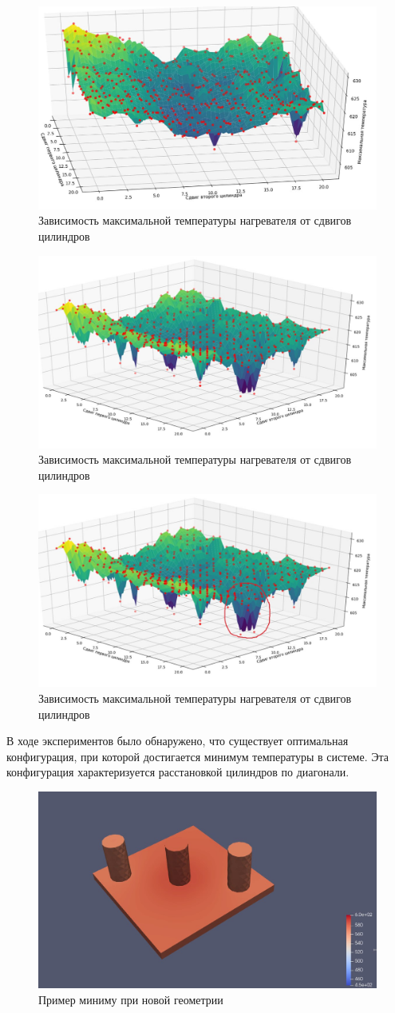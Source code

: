 \documentclass[a4paper,12pt]{article}
\theoremstyle{plain} %
\theoremstyle{definition} %
\theoremstyle{remark} %
\begin{document}
\begin{figure}[h]
	\begin{center}
		\includegraphics[width=0.4\linewidth]{21.1.jpg}
		\caption{Зависимость максимальной температуры нагревателя от сдвигов цилиндров} %
	\end{center}
\end{figure}
\begin{figure}[h]
	\begin{center}
		\includegraphics[width=0.4\linewidth]{21.2.jpg}
		\caption{Зависимость максимальной температуры нагревателя от сдвигов цилиндров} %
	\end{center}
\end{figure}
\begin{figure}[h]
	\begin{center}
		\includegraphics[width=0.4\linewidth]{21.3.jpg}
		\caption{Зависимость максимальной температуры нагревателя от сдвигов цилиндров} %
	\end{center}
\end{figure}

В ходе экспериментов было обнаружено, что существует оптимальная конфигурация, при которой достигается минимум температуры в системе. Эта конфигурация характеризуется расстановкой цилиндров по диагонали.

\begin{figure}[h]
	\begin{center}
		\includegraphics[width=0.4\linewidth]{21.4.jpg}
		\caption{Пример миниму при новой геометрии} %
	\end{center}
\end{figure}
\end{document}
